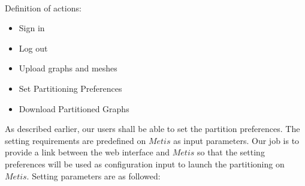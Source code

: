 \documentclass{cranfieldChart}
\begin{document}
\paragraph{}
Definition of actions: 
\begin{itemize}
    \item Sign in 
    \item Log out
    \item Upload graphs and meshes
    \item Set Partitioning Preferences 
    \item Download Partitioned Graphs 
\end{itemize}
As described earlier, our users shall be able to set the partition preferences. The setting requirements are predefined on $Metis$ as input parameters. Our job is to provide a link between the web interface and $Metis$ so that the setting preferences will be used as configuration input to launch the partitioning on $Metis$. Setting parameters are as followed:
\end{document}
